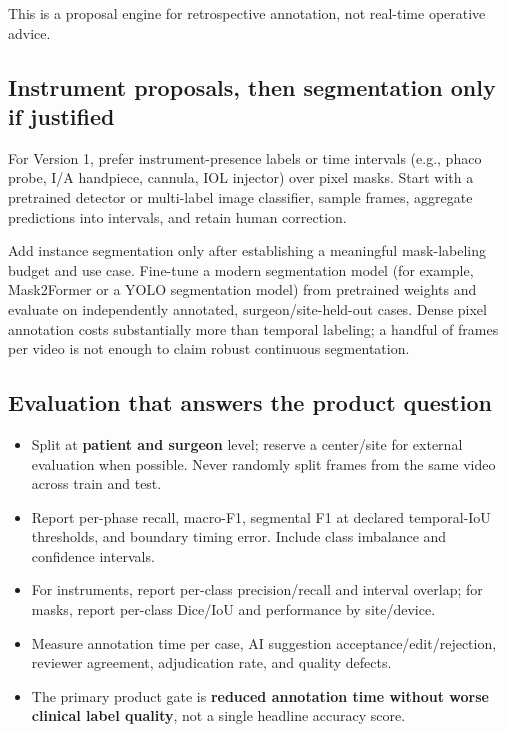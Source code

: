 \documentclass[11pt,a4paper]{article}
\begin{document}
This is a proposal engine for retrospective annotation, not real-time operative advice.

\subsection{Instrument proposals, then segmentation only if justified}

For Version 1, prefer instrument-presence labels or time intervals (e.g., phaco probe, I/A handpiece, cannula, IOL injector) over pixel masks. Start with a pretrained detector or multi-label image classifier, sample frames, aggregate predictions into intervals, and retain human correction.

Add instance segmentation only after establishing a meaningful mask-labeling budget and use case. Fine-tune a modern segmentation model (for example, Mask2Former or a YOLO segmentation model) from pretrained weights and evaluate on independently annotated, surgeon/site-held-out cases. Dense pixel annotation costs substantially more than temporal labeling; a handful of frames per video is not enough to claim robust continuous segmentation.

\subsection{Evaluation that answers the product question}

\begin{itemize}
  \item Split at \textbf{patient and surgeon} level; reserve a center/site for external evaluation when possible. Never randomly split frames from the same video across train and test.
  \item Report per-phase recall, macro-F1, segmental F1 at declared temporal-IoU thresholds, and boundary timing error. Include class imbalance and confidence intervals.
  \item For instruments, report per-class precision/recall and interval overlap; for masks, report per-class Dice/IoU and performance by site/device.
  \item Measure annotation time per case, AI suggestion acceptance/edit/rejection, reviewer agreement, adjudication rate, and quality defects.
  \item The primary product gate is \textbf{reduced annotation time without worse clinical label quality}, not a single headline accuracy score.
\end{itemize}
\end{document}
